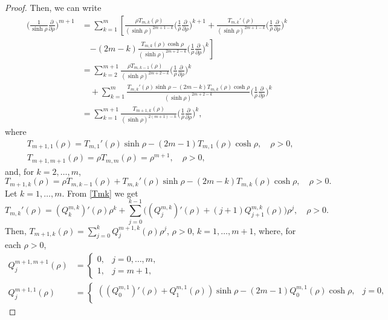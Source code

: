 \documentclass[a4paper,10pt, reqno]{amsart}
\theoremstyle{definition}
\theoremstyle{remark}
\numberwithin{equation}{section}
\begin{document}
{\begin{proof}
Then, we can write
\begin{align*}
 \Big(\frac{1}{\sinh \rho }\frac{\partial}{\partial \rho}\Big)^{m+1}&=\sum_{k=1}^m\left[\frac{\rho T_{m,k}(\rho )}{(\sinh \rho)^{2m+1-k}}\Big(\frac{1}{\rho }\frac{\partial }{\partial \rho} \Big)^{k+1}+ \frac{T_{m,k}'(\rho )}{(\sinh \rho)^{2m+1-k}}\Big(\frac{1}{\rho }\frac{\partial}{\partial \rho }\Big)^k\right.\\
 &\quad \left.-(2m-k)\frac{T_{m,k}(\rho )\cosh \rho }{(\sinh \rho)^{2m+2-k}}\Big(\frac{1}{\rho }\frac{\partial }{\partial \rho}\Big)^k\right]\\
 &=\sum_{k=2}^{m+1}\frac{\rho T_{m,k-1}(\rho )}{(\sinh \rho)^{2m+2-k}}\Big(\frac{1}{\rho }\frac{\partial }{\partial \rho}\Big)^k\\
 &\quad + \sum_{k=1}^m\frac{T_{m,k}'(\rho )\sinh \rho -(2m-k)T_{m,k}(\rho )\cosh \rho }{(\sinh \rho)^{2m+2-k}}\Big(\frac{1}{\rho}\frac{\partial}{\partial \rho}\Big)^k\\
 &=\sum_{k=1}^{m+1}\frac{T_{m+1,k}(\rho )}{(\sinh \rho )^{2(m+1)-k}}\Big(\frac{1}{\rho}\frac{\partial}{\partial \rho}\Big)^k,
\end{align*}
where
\begin{align}\label{T1}
&T_{m+1,1}(\rho )=T_{m,1}'(\rho )\sinh \rho -(2m-1)T_{m,1}(\rho )\cosh \rho,\quad \rho >0,\\
&T_{m+1,m+1}(\rho )=\rho T_{m,m}(\rho)=\rho ^{m+1},\quad \rho >0,\label{Tm}
\end{align}
and, for $k=2,\ldots, m$, 
\begin{equation}\label{Tk}
T_{m+1,k}(\rho )=\rho T_{m,k-1}(\rho )+T_{m,k}'(\rho )\sinh \rho -(2m-k)T_{m,k}(\rho )\cosh \rho,\quad \rho >0.
\end{equation}
Let $k=1,\ldots,m$. From \eqref{Tmk} we get
$$
T_{m,k}'(\rho )=(Q_k^{m,k})'(\rho )\rho ^k+\sum_{j=0}^{k-1}\big((Q_j^{m,k})'(\rho )+(j+1)Q_{j+1}^{m,k}(\rho )\big)\rho ^j,\quad \rho >0.
$$
Then, $T_{m+1,k}(\rho)=\sum_{j=0}^kQ_j^{m+1,k}(\rho )\rho ^j$, $\rho >0$, $k=1,\ldots, m+1$, where, for each $\rho >0$,
\begin{align}\label{Q11}
Q_j^{m+1,m+1}(\rho)&=\left\{
\begin{array}{ll}
0,&j=0,\ldots, m,\\[0.2cm]
1,&j=m+1,
\end{array}
\right.\nonumber\\
 Q_j^{m+1,1}(\rho)&=\left\{
\begin{array}{ll}
((Q_0^{m,1})'(\rho)+Q_1^{m,1}(\rho ))\sinh \rho-(2m-1)Q_0^{m,1}(\rho )\cosh \rho,&j=0,\\[0.2cm]

\end{array}
\end{align}
\end{proof}}
\end{document}
